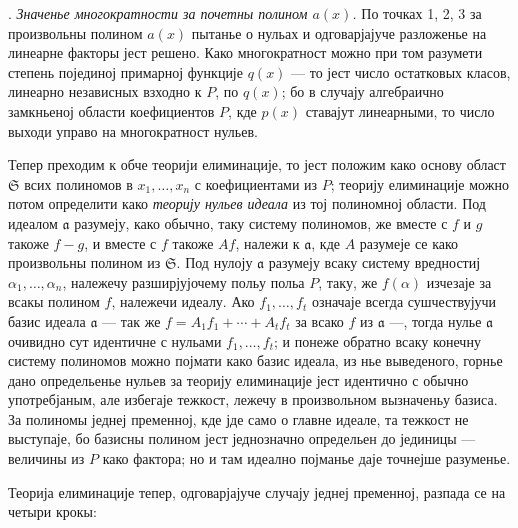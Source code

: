 ﻿\documentclass[11pt]{article}
\providecommand{\fraka}{\mathfrak a}
\providecommand{\frakS}{\mathfrak S}
\begin{document}
. \emph{Значенье многократности за почетны полином $a(x)$.} По точках 1, 2, 3 за произвольны полином $a(x)$ пытанье о нульах и одговарјајуче разложенье на линеарне факторы јест решено. Како многократност можно при том разумети степень појединој примарној функције $q(x)$ --- то јест число остатковых класов, линеарно независных взходно к $P$, по $q(x)$; бо в случају алгебраично замкньеној области коефициентов $P$, кде $p(x)$ ставајут линеарными, то число выходи управо на многократност нульев.

Тепер преходим к обче теорији елиминације, то јест положим како основу област $\frakS$ всих полиномов в $x_1,\ldots,x_n$ с коефициентами из $P$; теорију елиминације можно потом определити како \emph{теорију нульев идеала} из тој полиномној области. Под идеалом $\fraka$ разумеју, како обычно, таку систему полиномов, же вместе с $f$ и $g$ такоже $f-g$, и вместе с $f$ такоже $Af$, належи к $\fraka$, кде $A$ разумеје се како произвольны полином из $\frakS$. Под нулоју $\fraka$ разумеју всаку систему вредностиј $\alpha_1,\ldots,\alpha_n$, належечу разширјујочему польу польа $P$, таку, же $f(\alpha)$ изчезаје за всакы полином $f$, належечи идеалу. Ако $f_1,\ldots,f_t$ означаје всегда сушчествујучи базис идеала $\fraka$ --- так же $f=A_1f_1+\cdots+A_tf_t$ за всако $f$ из $\fraka$ ---, тогда нулье $\fraka$ очивидно сут идентичне с нульами $f_1,\ldots,f_t$; и понеже обратно всаку конечну систему полиномов можно појмати како базис идеала, из нье выведеного, горнье дано определьенье нульев за теорију елиминације јест идентично с обычно употребјаным, але избегаје тежкост, лежечу в произвольном вызначеньу базиса. За полиномы једнеј пременној, кде јде само о главне идеале, та тежкост не выступаје, бо базисны полином јест једнозначно определьен до јединицы --- величины из $P$ како фактора; но и там идеално појманье даје точнејше разуменье.

Теорија елиминације тепер, одговарјајуче случају једнеј пременној, разпада се на четыри крокы:
\end{document}
